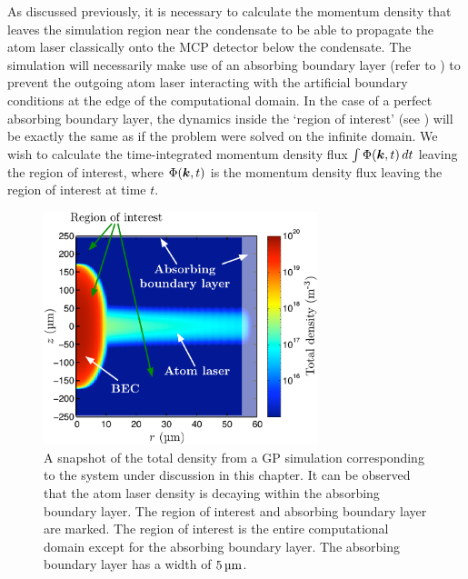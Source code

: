 As discussed previously, it is necessary to calculate the momentum density that leaves the simulation region near the condensate to be able to propagate the atom laser classically onto the MCP detector below the condensate. The simulation will necessarily make use of an absorbing boundary layer (refer to ) to prevent the outgoing atom laser interacting with the artificial boundary conditions at the edge of the computational domain.  In the case of a perfect absorbing boundary layer, the dynamics inside the `region of interest' (see ) will be exactly the same as if the problem were solved on the infinite domain. We wish to calculate the time-integrated momentum density flux $\int \Phi(\bm{k}, t) \, dt$ leaving the region of interest, where $\Phi(\bm{k}, t)$ is the momentum density flux leaving the region of interest at time $t$.

\begin{figure}
    \centering
    \includegraphics[width=8cm]{RegionOfInterest}
    \caption{A snapshot of the total density from a GP simulation corresponding to the system under discussion in this chapter. It can be observed that the atom laser density is decaying within the absorbing boundary layer. The region of interest and absorbing boundary layer are marked. The region of interest is the entire computational domain except for the absorbing boundary layer. The absorbing boundary layer has a width of $\unit[5]{\micro m}$. \label{Peaks:RegionOfInterest}}
\end{figure}

